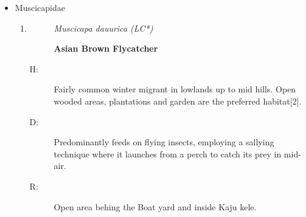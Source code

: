 \begin{itemize}
\begin{enumerate}
\begin{description}
\end{description}%
\begin{description}%
\item[H: ]%
Fairly common winter migrant throughout. Paths and open spaces in wooded areas are the preferred habitat{[}2{]}.%
\item[D: ]%
The diet primarily includes tiny invertebrates like ants, beetles, small grasshoppers, butterflies, cicadas, and various other insects. It also includes spiders, small mollusks, and worms.%
\item[R: ]%
Observed multiple times but only at hotspot 2, Kaju kele.%
\end{description}%
\item%
\begin{description}%
\item[]%
\textit{Anthus rufulus (LC)}%
\item[]%
\textbf{Paddyfield Pipit}%
\end{description}%
\begin{description}%
\item[H: ]%
Fairly common breeding resident throughout the country. Grasslands and low scrub are the preferred habitat{[}2{]}.%
\item[D: ]%
Primary diet consists of small insects, yet it also indulges in larger prey such as beetles, small snails, and worms while traversing the ground. %
\item[R: ]%
In university ground premises.%
\end{description}%
\end{enumerate}%
\item%
Muscicapidae%
\begin{enumerate}%
\item%
\begin{description}%
\item[]%
\textit{Muscicapa dauurica (LC*)}%
\item[]%
\textbf{Asian Brown Flycatcher}%
\end{description}%
\begin{description}%
\item[H: ]%
Fairly common winter migrant in lowlands up to mid hills. Open wooded areas, plantations and garden are the preferred habitat{[}2{]}.%
\item[D: ]%
Predominantly feeds on flying insects, employing a sallying technique where it launches from a perch to catch its prey in mid{-}air.%
\item[R: ]%
Open area behing the Boat yard and inside Kaju kele.%

\end{description}
\end{enumerate}
\end{itemize}
